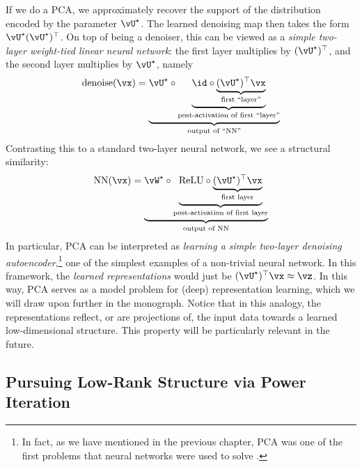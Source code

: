 \documentclass[../../book-main.tex]{subfiles}
\begin{document}
\begin{remark}
    If we do a PCA, we approximately recover the support of the distribution
    encoded by the parameter \(\vU^{\star}\). The learned denoising map then
    takes the form \(\vU^{\star}(\vU^{\star})^{\top}\). On top of being
    a denoiser, this can be viewed as a \textit{simple two-layer weight-tied
    linear neural network}: the first layer multiplies by
    \((\vU^{\star})^{\top}\), and the second layer multiplies by
    \(\vU^{\star}\), namely
    \begin{equation}
        \operatorname{denoise}(\vx) = \underbrace{\vU^{\star} \circ
            \underbrace{\id \circ
                \underbrace{(\vU^{\star})^{\top}\vx}_{\text{first
            ``layer''}}}_{\text{post-activation of first
        ``layer''}}}_{\text{output of ``NN''}}
    \end{equation}
    Contrasting this to a standard two-layer neural network, we see a
    structural similarity:
    \begin{equation}
        \operatorname{NN}(\vx) = \underbrace{\vW^{\star} \circ
            \underbrace{\mathrm{ReLU} \circ
                \underbrace{(\vU^{\star})^{\top}\vx}_{\text{first
        layer}}}_{\text{post-activation of first layer}}}_{\text{output of NN}}
    \end{equation}
    In particular, PCA can be interpreted as \textit{learning a simple two-layer
    denoising autoencoder},\footnote{In fact, as we have mentioned in the
        previous chapter, PCA was one of the first problems that neural networks
    were used to solve \cite{Oja1982SimplifiedNM,Baldi89}.} one of the simplest
    examples of a non-trivial neural network. In this framework, the
    \textit{learned representations} would just be
    \((\vU^{\star})^{\top}\vx \approx \vz\). In this way, PCA serves
    as a model problem for (deep) representation learning, which we
    will draw upon further in the monograph. Notice that in this
    analogy, the representations reflect, or are projections of, the
    input data towards a learned low-dimensional structure. This
    property will be particularly relevant in the future.
\end{remark}

\subsection{Pursuing Low-Rank Structure via Power
Iteration}\label{subsec:power iterations}
\end{document}
